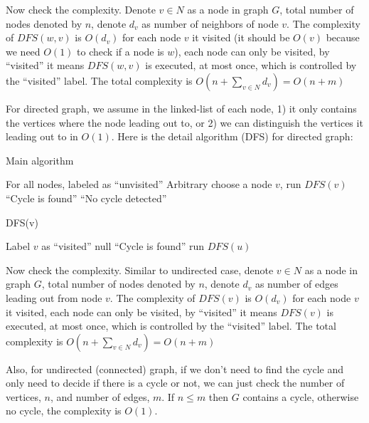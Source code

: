 				Now check the complexity. Denote $v\in N$ as a node in graph $G$, total number of nodes denoted by $n$, denote $d_v$ as number of neighbors of node $v$. The complexity of $DFS(w, v)$ is $O(d_v)$ for each node $v$ it visited (it should be $O(v)$ because we need $O(1)$ to check if a node is $w$), each node can only be visited, by ``visited'' it means $DFS(w, v)$ is executed, at most once, which is controlled by the ``visited'' label. The total complexity is $O(n + \sum_{v\in N} d_v) = O(n + m)$

				For directed graph, we assume in the linked-list of each node, 1) it only contains the vertices where the node leading out to, or 2) we can distinguish the vertices it leading out to in $O(1)$. Here is the detail algorithm (DFS) for directed graph:
				\begin{algorithm}[H]
					\caption{Main algorithm}
					\begin{algorithmic}[1]
						\State For all nodes, labeled as ``unvisited''
						\State Arbitrary choose a node $v$, run $DFS(v)$
							\State \Return ``Cycle is found''
						\Else
							\State \Return ``No cycle detected''
						\EndIf
					\end{algorithmic}
				\end{algorithm}

				\begin{algorithm}[H]
					\caption{DFS(v)}
					\begin{algorithmic}[1]
						\State Label $v$ as ``visited''
							\State \Return null
						\Else
									\State \Return ``Cycle is found'' 
								\Else
									\State run $DFS(u)$
								\EndIf
							\EndFor
						\EndIf
					\end{algorithmic}
				\end{algorithm}

				Now check the complexity. Similar to undirected case, denote $v\in N$ as a node in graph $G$, total number of nodes denoted by $n$, denote $d_v$ as number of edges leading out from node $v$. The complexity of $DFS(v)$ is $O(d_v)$ for each node $v$ it visited, each node can only be visited, by ``visited'' it means $DFS(v)$ is executed, at most once, which is controlled by the ``visited'' label. The total complexity is $O(n + \sum_{v\in N} d_v) = O(n + m)$

				Also, for undirected (connected) graph, if we don't need to find the cycle and only need to decide if there is a cycle or not, we can just check the number of vertices, $n$, and number of edges, $m$. If $n \le m$ then $G$ contains a cycle, otherwise no cycle, the complexity is $O(1)$.

